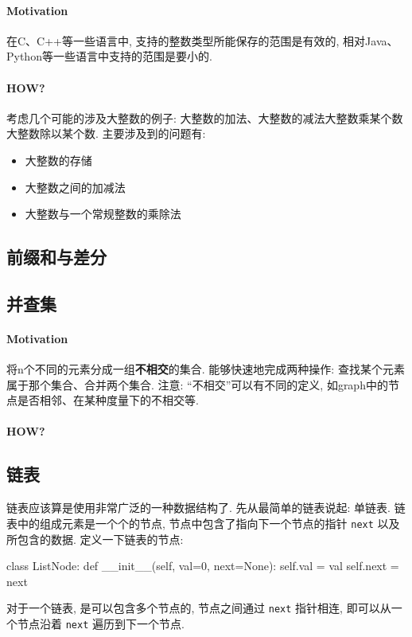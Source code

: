 \paragraph{Motivation}在C、C++等一些语言中, 支持的整数类型所能保存的范围是有效的, 相对Java、Python等一些语言中支持的范围是要小的. 

\paragraph{HOW?}考虑几个可能的涉及大整数的例子: 大整数的加法、大整数的减法大整数乘某个数大整数除以某个数. 主要涉及到的问题有: 
\begin{itemize}
	\item 大整数的存储
	\item 大整数之间的加减法
	\item 大整数与一个常规整数的乘除法
\end{itemize}


\subsection{前缀和与差分}


\subsection{并查集}
\paragraph{Motivation}将n个不同的元素分成一组\textbf{不相交}的集合. 能够快速地完成两种操作: 查找某个元素属于那个集合、合并两个集合. 注意: “不相交”可以有不同的定义, 如graph中的节点是否相邻、在某种度量下的不相交等. 

\paragraph{HOW?}

\subsection{链表}
链表应该算是使用非常广泛的一种数据结构了. 先从最简单的链表说起: 单链表. 链表中的组成元素是一个个的节点, 节点中包含了指向下一个节点的指针 \texttt{next} 以及所包含的数据. 定义一下链表的节点: 
\begin{python}
	class ListNode:
	     def __init__(self, val=0, next=None):
	         self.val = val
	         self.next = next
\end{python}
对于一个链表, 是可以包含多个节点的, 节点之间通过 \texttt{next} 指针相连, 即可以从一个节点沿着 \texttt{next} 遍历到下一个节点. 

